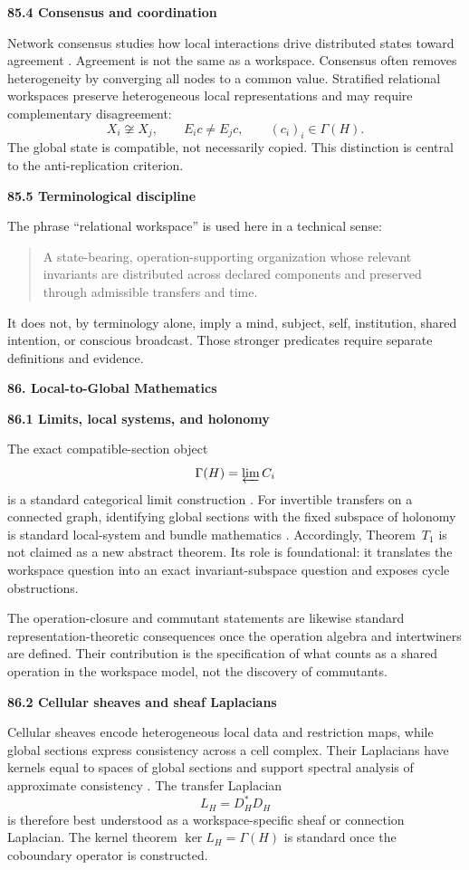 \documentclass[11pt,letterpaper]{article}
\newcommand{\topic}[2]{%
 \phantomsection
 \addcontentsline{toc}{subsection}{#1. #2}%
 \vspace{0.8em}
 {\large\bfseries\color{PartColor} #1. #2\par}
 \vspace{0.15em}
}
\newcommand{\subtopic}[1]{%
 \vspace{0.45em}
 {\bfseries\color{AccentColor} #1\par}
}
\theoremstyle{plain}
\theoremstyle{definition}
\begin{document}
\subtopic{85.4 Consensus and coordination}

Network consensus studies how local interactions drive distributed states
toward agreement \cite{OlfatiSaberEtAl2007}. Agreement is not the same as a
workspace. Consensus often removes heterogeneity by converging all nodes to a
common value. Stratified relational workspaces preserve heterogeneous local
representations and may require complementary disagreement:
\[
X_i\not\cong X_j,
\qquad
E_i c\neq E_j c,
\qquad
(c_i)_i\in\Gamma(H).
\]
The global state is compatible, not necessarily copied. This distinction is
central to the anti-replication criterion.

\subtopic{85.5 Terminological discipline}

The phrase ``relational workspace'' is used here in a technical sense:
\begin{quote}
A state-bearing, operation-supporting organization whose relevant invariants
are distributed across declared components and preserved through admissible
transfers and time.
\end{quote}
It does not, by terminology alone, imply a mind, subject, self, institution,
shared intention, or conscious broadcast. Those stronger predicates require
separate definitions and evidence.

\topic{86}{Local-to-Global Mathematics}

\subtopic{86.1 Limits, local systems, and holonomy}

The exact compatible-section object
\[
\Gamma(H)=\varprojlim C_i
\]
is a standard categorical limit construction \cite{MacLane1998}. For
invertible transfers on a connected graph, identifying global sections with
the fixed subspace of holonomy is standard local-system and bundle mathematics
\cite{Hatcher2002,Bredon1997}. Accordingly, Theorem~\(T_1\) is not claimed as
a new abstract theorem. Its role is foundational: it translates the workspace
question into an exact invariant-subspace question and exposes cycle
obstructions.

The operation-closure and commutant statements are likewise standard
representation-theoretic consequences once the operation algebra and
intertwiners are defined. Their contribution is the specification of what
counts as a shared operation in the workspace model, not the discovery of
commutants.

\subtopic{86.2 Cellular sheaves and sheaf Laplacians}

Cellular sheaves encode heterogeneous local data and restriction maps, while
global sections express consistency across a cell complex. Their Laplacians
have kernels equal to spaces of global sections and support spectral analysis
of approximate consistency \cite{HansenGhrist2019,Robinson2017}. The transfer
Laplacian
\[
L_H=D_H^*D_H
\]
is therefore best understood as a workspace-specific sheaf or connection
Laplacian. The kernel theorem \(\ker L_H=\Gamma(H)\) is standard once the
coboundary operator is constructed.
\end{document}
